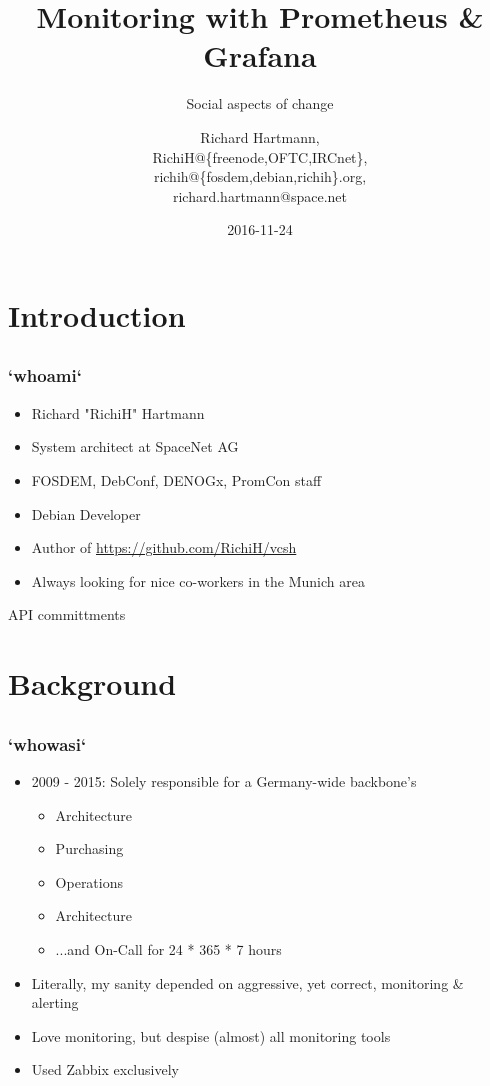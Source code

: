 \documentclass[t]{beamer}
\title{Monitoring with Prometheus \& Grafana}
\subtitle{Social aspects of change}
\author{Richard Hartmann,\\
RichiH@\{freenode,OFTC,IRCnet\},\\
richih@\{fosdem,debian,richih\}.org,\\
richard.hartmann@space.net}
\date{2016-11-24}
\begin{document}
\setcounter{tocdepth}{1}

\begin{frame}
	\titlepage
\end{frame}


\section{Introduction}

\subsection{}

\begin{frame}
	\frametitle{`whoami`}
	\begin{itemize}
		\item Richard "RichiH" Hartmann
		\item System architect at SpaceNet AG
		\item FOSDEM, DebConf, DENOGx, PromCon staff
		\item Debian Developer
		\item Author of \url{https://github.com/RichiH/vcsh}
		\item Always looking for nice co-workers in the Munich area
	\end{itemize}
\end{frame}

API committments


\section{Background}

\subsection{}

\begin{frame}
	\frametitle{`whowasi`}
	\begin{itemize}
		\item 2009 - 2015: Solely responsible for a Germany-wide backbone's
		\begin{itemize}
			\item Architecture
			\item Purchasing
			\item Operations
			\item Architecture
			\item ...and On-Call for 24 * 365 * 7 hours
		\end{itemize}
		\item Literally, my sanity depended on aggressive, yet correct, monitoring \& alerting
		\item Love monitoring, but despise (almost) all monitoring tools
		\item Used Zabbix exclusively
	\end{itemize}
\end{frame}
\end{document}
